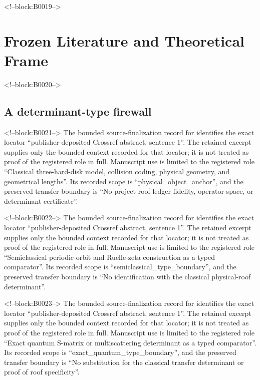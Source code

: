 \documentclass[11pt,a4paper]{article}
\begin{document}
<!--block:B0019-->
\section{Frozen Literature and Theoretical Frame}

<!--block:B0020-->
\subsection{A determinant-type firewall}

<!--block:B0021-->
The bounded source-finalization record for \citep{P30-S01} identifies
the exact locator ``publisher-deposited Crossref abstract, sentence 1''.  The retained excerpt supplies only the
bounded context recorded for that locator; it is not treated as proof of the
registered role in full.  Manuscript use is limited to the registered role ``Classical three-hard-disk model, collision coding, physical geometry, and geometrical lengths''.
Its recorded scope is ``physical\_object\_anchor'', and the preserved
transfer boundary is ``No project roof-ledger fidelity, operator space, or determinant certificate''.

<!--block:B0022-->
The bounded source-finalization record for \citep{P30-S02} identifies
the exact locator ``publisher-deposited Crossref abstract, sentence 1''.  The retained excerpt supplies only the
bounded context recorded for that locator; it is not treated as proof of the
registered role in full.  Manuscript use is limited to the registered role ``Semiclassical periodic-orbit and Ruelle-zeta construction as a typed comparator''.
Its recorded scope is ``semiclassical\_type\_boundary'', and the preserved
transfer boundary is ``No identification with the classical physical-roof determinant''.

<!--block:B0023-->
The bounded source-finalization record for \citep{P30-S03} identifies
the exact locator ``publisher-deposited Crossref abstract, sentence 1''.  The retained excerpt supplies only the
bounded context recorded for that locator; it is not treated as proof of the
registered role in full.  Manuscript use is limited to the registered role ``Exact quantum S-matrix or multiscattering determinant as a typed comparator''.
Its recorded scope is ``exact\_quantum\_type\_boundary'', and the preserved
transfer boundary is ``No substitution for the classical transfer determinant or proof of roof specificity''.
\end{document}
